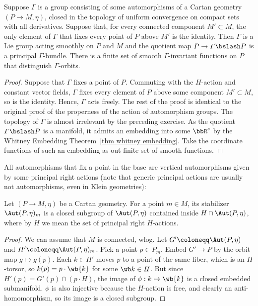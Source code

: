 \begin{thm}\label{lem thm 12.28 McKay}
    Suppose $\varGamma$ is a group consisting of some automorphisms of a Cartan geometry $(P\to M,\eta)$, closed in the topology of uniform convergence on compact sets with all derivatives. Suppose that, for every connected component $M'\subset M$, the only element of $\varGamma$ that fixes every point of $P$ above $M'$ is the identity. Then $\varGamma$ is a Lie group acting smoothly on $P$ and $M$ and the quotient map $P\to \varGamma\bslash P$ is a principal $\varGamma$-bundle. There is a finite set of smooth $\varGamma$-invariant functions on $P$ that distinguish $\varGamma$-orbits.
\end{thm}
\begin{proof}
    Suppose that $\varGamma$ fixes a point of $P$. Commuting with the $H$-action and constant vector fields, $\varGamma$ fixes every element of $P$ above some component $M'\subset M$, so is the identity. Hence, $\varGamma$ acts freely. The rest of the proof is identical to the original proof of the properness of the action of automorphism groups. The topology of $\varGamma$ is almost irrelevant by the preceding exercise. As the quotient $\varGamma\bslash P$ is a manifold, it admits an embedding into some $\bbR^s$ by the Whitney Embedding Theorem~\ref{thm whitney embedding}. Take the coordinate functions of such an embedding as out finite set of smooth functions.
\end{proof}

All automorphisms that fix a point in the base are vertical automorphisms given by some principal right actions (note that generic principal actions are usually not automorphisms, even in Klein geometries):

\begin{lem}
    Let $(P\to M,\eta)$ be a Cartan geometry. For a point $m\in M$, its stabilizer $\Aut(P,\eta)_m$ is a closed subgroup of $\Aut(P,\eta)$ contained inside $H\cap \Aut(P,\eta)$, where by $H$ we mean the set of principal right $H$-actions.
\end{lem}
\begin{proof}
    We can assume that $M$ is connected, \gls{wlog}. Let $G'\coloneqq \Aut(P,\eta)$ and $H'\coloneqq \Aut(P,\eta)_m$. Pick a point $p\in P_m$. Embed $G'\to P$ by the orbit map $g\mapsto g(p)$. Each $k\in H'$ moves $p$ to a point of the same fiber, which is an $H$-torsor, so $k(p)=p\cdot \wb{k}$ for some $\wb k\in H$. But since $H'(p)=G'(p)\cap (p\cdot H)$, the image of $\phi:k\mapsto \wb{k}$ is a closed embedded submanifold. $\phi$ is also injective because the $H$-action is free, and clearly an anti-homomorphism, so its image is a closed subgroup.
\end{proof}

